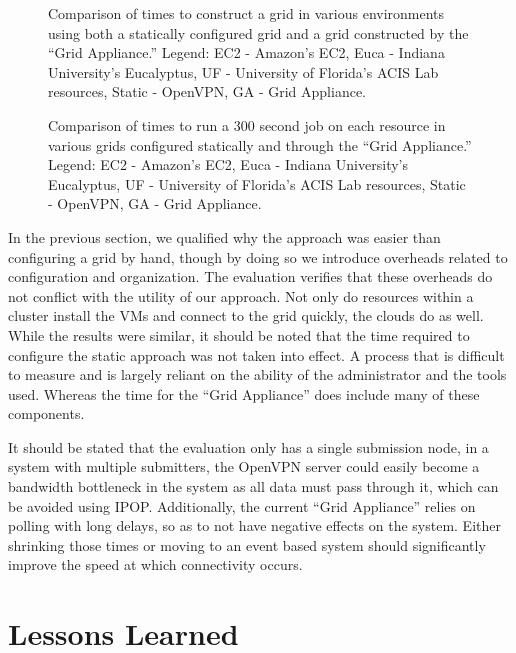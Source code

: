 \documentclass[conference]{IEEEtran}
\begin{document}
\begin{figure}[ht]
\centering
{}
\caption{Comparison of times to construct a grid in various environments using
both a statically configured grid and a grid constructed by the ``Grid
Appliance.''  Legend:  EC2 - Amazon's EC2, Euca - Indiana University's
Eucalyptus, UF - University of Florida's ACIS Lab resources, Static - OpenVPN,
GA - Grid Appliance.}
\label{fig:connect}
\end{figure}

\begin{figure}[ht]
\centering
{}
\caption{Comparison of times to run a 300 second job on each resource in
various grids configured statically and through the ``Grid Appliance.''
Legend:  EC2 - Amazon's EC2, Euca - Indiana University's Eucalyptus, UF -
University of Florida's ACIS Lab resources, Static - OpenVPN, GA - Grid
Appliance.}
\label{fig:run}
\end{figure}

In the previous section, we qualified why the approach was easier than
configuring a grid by hand, though by doing so we introduce overheads related
to configuration and organization.  The evaluation verifies that these
overheads do not conflict with the utility of our approach.  Not only do
resources within a cluster install the VMs and connect to the grid quickly, the
clouds do as well.  While the results were similar, it should be noted that the
time required to configure the static approach was not taken into effect.  A
process that is difficult to measure and is largely reliant on the ability of
the administrator and the tools used.  Whereas the time for the ``Grid
Appliance'' does include many of these components.

It should be stated that the evaluation only has a single submission node, in a
system with multiple submitters, the OpenVPN server could easily become a
bandwidth bottleneck in the system as all data must pass through it, which can
be avoided using IPOP.  Additionally, the current ``Grid Appliance'' relies on
polling with long delays, so as to not have negative effects on the system.
Either shrinking those times or moving to an event based system should
significantly improve the speed at which connectivity occurs.  

\section{Lessons Learned}
\label{lessons_learned}
\end{document}
